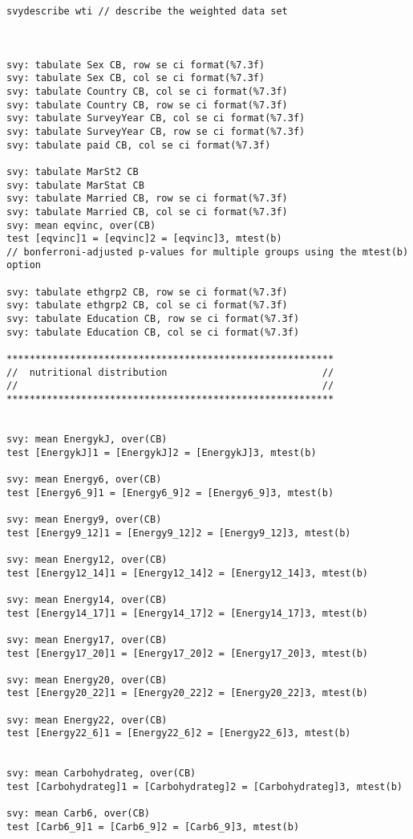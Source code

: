 \documentclass[]{article}
\begin{document}
\begin{verbatim}
svydescribe wti // describe the weighted data set



svy: tabulate Sex CB, row se ci format(%7.3f)
svy: tabulate Sex CB, col se ci format(%7.3f)
svy: tabulate Country CB, col se ci format(%7.3f)
svy: tabulate Country CB, row se ci format(%7.3f)
svy: tabulate SurveyYear CB, col se ci format(%7.3f)
svy: tabulate SurveyYear CB, row se ci format(%7.3f)
svy: tabulate paid CB, col se ci format(%7.3f)
    
svy: tabulate MarSt2 CB
svy: tabulate MarStat CB
svy: tabulate Married CB, row se ci format(%7.3f)
svy: tabulate Married CB, col se ci format(%7.3f)
svy: mean eqvinc, over(CB)
test [eqvinc]1 = [eqvinc]2 = [eqvinc]3, mtest(b) 
// bonferroni-adjusted p-values for multiple groups using the mtest(b) option

svy: tabulate ethgrp2 CB, row se ci format(%7.3f)
svy: tabulate ethgrp2 CB, col se ci format(%7.3f)
svy: tabulate Education CB, row se ci format(%7.3f)
svy: tabulate Education CB, col se ci format(%7.3f)

*********************************************************
//  nutritional distribution                           //
//                                                     //
*********************************************************


svy: mean EnergykJ, over(CB)
test [EnergykJ]1 = [EnergykJ]2 = [EnergykJ]3, mtest(b) 

svy: mean Energy6, over(CB)
test [Energy6_9]1 = [Energy6_9]2 = [Energy6_9]3, mtest(b) 

svy: mean Energy9, over(CB) 
test [Energy9_12]1 = [Energy9_12]2 = [Energy9_12]3, mtest(b) 

svy: mean Energy12, over(CB)
test [Energy12_14]1 = [Energy12_14]2 = [Energy12_14]3, mtest(b) 

svy: mean Energy14, over(CB)
test [Energy14_17]1 = [Energy14_17]2 = [Energy14_17]3, mtest(b) 

svy: mean Energy17, over(CB)
test [Energy17_20]1 = [Energy17_20]2 = [Energy17_20]3, mtest(b) 

svy: mean Energy20, over(CB)
test [Energy20_22]1 = [Energy20_22]2 = [Energy20_22]3, mtest(b) 

svy: mean Energy22, over(CB)
test [Energy22_6]1 = [Energy22_6]2 = [Energy22_6]3, mtest(b) 


svy: mean Carbohydrateg, over(CB)
test [Carbohydrateg]1 = [Carbohydrateg]2 = [Carbohydrateg]3, mtest(b) 

svy: mean Carb6, over(CB)
test [Carb6_9]1 = [Carb6_9]2 = [Carb6_9]3, mtest(b) 


\end{verbatim}
\end{document}
